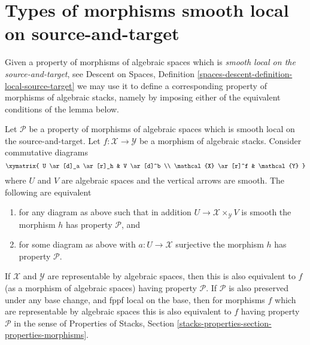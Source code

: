 \section{Types of morphisms smooth local on source-and-target}
\label{section-local-source-target}

\noindent
Given a property of morphisms of algebraic spaces which is
{\it smooth local on the source-and-target}, see
Descent on Spaces,
Definition \ref{spaces-descent-definition-local-source-target}
we may use it to define a corresponding
property of morphisms of algebraic stacks, namely by imposing either of
the equivalent conditions of the lemma below.

\begin{lemma}
\label{lemma-local-source-target}
Let $\mathcal{P}$ be a property of morphisms of algebraic spaces
which is smooth local on the source-and-target.
Let $f : \mathcal{X} \to \mathcal{Y}$ be a morphism of algebraic stacks.
Consider commutative diagrams
$$
\xymatrix{
U \ar[d]_a \ar[r]_h & V \ar[d]^b \\
\mathcal{X} \ar[r]^f & \mathcal{Y}
}
$$
where $U$ and $V$ are algebraic spaces and the vertical arrows are smooth.
The following are equivalent
\begin{enumerate}
\item for any diagram as above such that in addition
$U \to \mathcal{X} \times_\mathcal{Y} V$ is smooth
the morphism $h$ has property $\mathcal{P}$, and
\item for some diagram as above with $a : U \to \mathcal{X}$ surjective
the morphism $h$ has property $\mathcal{P}$.
\end{enumerate}
If $\mathcal{X}$ and $\mathcal{Y}$ are representable by algebraic spaces,
then this is also equivalent to $f$ (as a morphism of algebraic spaces)
having property $\mathcal{P}$. If $\mathcal{P}$ is also preserved under
any base change, and fppf local on the base, then for morphisms $f$
which are representable by algebraic spaces this
is also equivalent to $f$ having property $\mathcal{P}$ in the sense
of
Properties of Stacks,
Section \ref{stacks-properties-section-properties-morphisms}.
\end{lemma}

